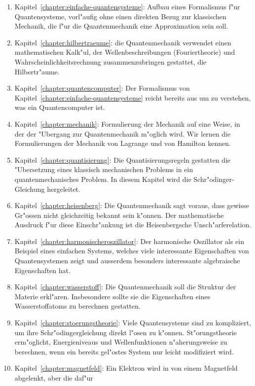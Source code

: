 \begin{enumerate}
\item Kapitel~\ref{chapter:einfache-quantensysteme}:
Aufbau eines Formalismus f"ur Quantensysteme, vorl"aufig ohne einen
direkten Bezug zur klassischen Mechanik, die f"ur die Quantenmechanik
eine Approximation sein soll.
\item Kapitel~\ref{chapter:hilbertraeume}:
die Quantenmechanik verwendet
einen mathematischen Kalk"ul, der Wellenbeschreibungen (Fouriertheorie)
und Wahrscheinlichkeitsrechnung zusammenzubringen gestattet, die Hilbertr"aume.
\item Kapitel~\ref{chapter:quantencomputer}: 
Der Formalismus von Kapitel~\ref{chapter:einfache-quantensysteme}
reicht bereits aus um zu verstehen, was ein Quantencomputer ist.
\item Kapitel~\ref{chapter:mechanik}:
Formulierung der Mechanik auf 
eine Weise, in der der "Ubergang zur Quantenmechanik m"oglich wird.
Wir lernen die Formulierungen der Mechanik von Lagrange und von Hamilton
kennen.
\item Kapitel~\ref{chapter:quantisierung}:
Die Quantisierungsregeln
gestatten die "Ubersetzung eines klassisch mechanischen Problems in 
ein quantenmechanisches Problem. In diesem Kapitel wird die
Schr"odinger-Gleichung hergeleitet.
\item Kapitel~\ref{chapter:heisenberg}:
Die Quantenmechanik sagt voraus, dass gewisse Gr"ossen nicht gleichzeitig
bekannt sein k"onnen. 
Der mathematische Ausdruck f"ur diese Einschr"ankung ist die 
Heisenbergsche Unsch"arferelation.
\item Kapitel~\ref{chapter:harmonischeroszillator}:
Der harmonische
Oszillator als ein Beispiel eines einfachen Systems, welches
viele interessante Eigenschaften von Quantensystemen zeigt und 
ausserdem besonders interessante algebraische Eigenschaften hat.
\item Kapitel~\ref{chapter:wasserstoff}:
Die Quantenmechanik soll
die Struktur der Materie erkl"aren. Insbesondere sollte sie 
die Eigenschaften eines Wasserstoffatoms zu berechnen gestatten.
\item Kapitel~\ref{chapter:stoerungstheorie}:
Viele Quantensysteme sind zu kompliziert, um ihre Schr"odingergleichung
direkt l"osen zu k"onnen.
St"orungstheorie erm"oglicht, Energieniveaus und Wellenfunktionen
n"aherungsweise zu berechnen, wenn ein bereits gel"ostes System
nur leicht modifiziert wird.
\item Kapitel~\ref{chapter:magnetfeld}:
Ein Elektron wird in von einem Magnetfeld abgelenkt, aber die daf"ur

\end{enumerate}
